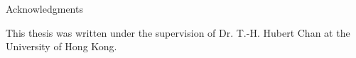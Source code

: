 \thispagestyle{empty}

\vspace*{20mm}

\begin{center}
{ Acknowledgments}
\end{center}

\vspace{10mm}

This thesis was written under the supervision of Dr. T.-H. Hubert Chan at the University of Hong Kong.


\cleardoublepage{}
